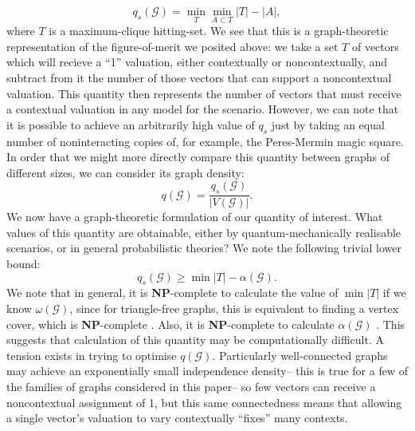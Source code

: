\documentclass{amsart}
\theoremstyle{definition}
\begin{document}
\begin{equation}q_s(\mathcal{G})=\min_T \min_{A\subset T} |T|-|A|,\end{equation}
where $T$ is a maximum-clique hitting-set. We see that this is a graph-theoretic representation of the figure-of-merit we posited above: we take a set $T$ of vectors which will recieve a ``1'' valuation, either contextually or noncontextually, and subtract from it the number of those vectors that can support a noncontextual valuation. This quantity then represents the number of vectors that must receive a contextual valuation in any model for the scenario. However, we can note that it is possible to achieve an arbitrarily high value of $q_s$ just by taking an equal number of noninteracting copies of, for example, the Peres-Mermin magic square. In order that we might more directly compare this quantity between graphs of different sizes, we can consider its graph density:
\begin{equation}
q(\mathcal{G})=\frac{q_s(\mathcal{G})}{|V(\mathcal{G})|}.
\end{equation}
We now have a graph-theoretic formulation of our quantity of interest. What values of this quantity are obtainable, either by quantum-mechanically realisable scenarios, or in general probabilistic theories? We note the following trivial lower bound:
\begin{equation}
q_s(\mathcal{G})\geq \min |T|-\alpha(\mathcal{G}).
\end{equation}
We note that in general, it is \textbf{NP}-complete to calculate the value of $\min |T|$ if we know $\omega(\mathcal{G})$, since for triangle-free graphs, this is equivalent to finding a vertex cover, which is \textbf{NP}-complete \cite{Polj1974}. Also, it is \textbf{NP}-complete to calculate $\alpha(\mathcal{G})$ \cite{Gare1979}. This suggests that calculation of this quantity may be computationally difficult. A tension exists in trying to optimise $q(\mathcal{G})$. Particularly well-connected graphs may achieve an exponentially small independence density-- this is true for a few of the families of graphs considered in this paper-- so few vectors can receive a noncontextual assignment of 1, but this same connectedness means that allowing a single vector's valuation to vary contextually ``fixes'' many contexts.
\end{document}
